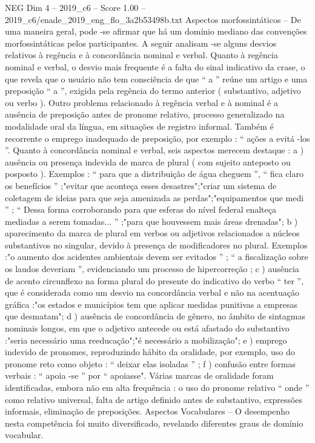 \begin{textsample}{NEG Dim 4 – 2019\_c6 – Score 1.00 – 2019\_c6/enade\_2019\_eng\_flo\_3a2b53498b.txt}
Aspectos morfossintáticos – De uma maneira geral, pode -se afirmar que há um domínio mediano das convenções morfossintáticas pelos participantes.
A seguir analisam -se alguns desvios relativos à regência e à concordância nominal e verbal.
Quanto à regência nominal e verbal, o desvio mais frequente é a falta do sinal indicativo da crase, o que revela que o usuário não tem consciência de que “ a ” reúne um artigo e uma preposição “ a ”, exigida pela regência do termo anterior ( substantivo, adjetivo ou verbo ).
Outro problema relacionado à regência verbal e à nominal é a ausência de preposição antes de pronome relativo, processo generalizado na modalidade oral da língua, em situações de registro informal.
Também é recorrente o emprego inadequado de preposição, por exemplo : “ ações a evitá -los ”.
Quanto à concordância nominal e verbal, seis aspectos merecem destaque : a ) ausência ou presença indevida de marca de plural ( com sujeito anteposto ou posposto ).
Exemplos : “ para que a distribuição de água cheguem ”, “ fica claro os benefícios ” ;"evitar que aconteça esses desastres";"criar um sistema de coletagem de ideias para que seja amenizada as perdas";"equipamentos que medi ” ; “ Dessa forma corroborando para que esferas do nível federal enalteça mediadas a serem tomadas... ” ;"para que houvessem mais áreas drenadas"; b ) aparecimento da marca de plural em verbos ou adjetivos relacionados a núcleos substantivos no singular, devido à presença de modificadores no plural.
Exemplos :"o aumento dos acidentes ambientais devem ser evitados ” ; “ a fiscalização sobre os laudos deveriam ”, evidenciando um processo de hipercorreção ; c ) ausência de acento circunflexo na forma plural do presente do indicativo do verbo “ ter ”, que é considerada como um desvio na concordância verbal e não na acentuação gráfica :"os estados e municípios tem que aplicar medidas punitivas a empresas que desmatam"; d ) ausência de concordância de gênero, no âmbito de sintagmas nominais longos, em que o adjetivo antecede ou está afastado do substantivo :"seria necessário uma reeducação";"é necessário a mobilização"; e ) emprego indevido de pronomes, reproduzindo hábito da oralidade, por exemplo, uso do pronome reto como objeto : “ deixar elas isoladas ” ; f ) confusão entre formas verbais : “ apoia -se ” por “ apoiasse".
Várias marcas de oralidade foram identificadas, embora não em alta frequência : o uso do pronome relativo “ onde ” como relativo universal, falta de artigo definido antes de substantivo, expressões informais, eliminação de preposições.
Aspectos Vocabulares – O desempenho nesta competência foi muito diversificado, revelando diferentes graus de domínio vocabular.

\end{textsample}
